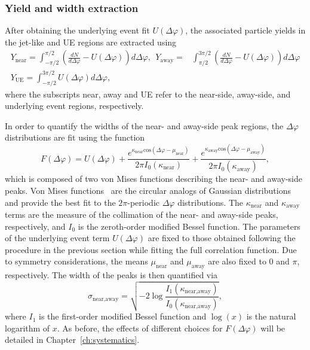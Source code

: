 \subsubsection{Yield and width extraction}
\label{sec:yield_extraction}
 After obtaining the underlying event fit $U(\Delta\varphi)$, the associated particle yields in the jet-like and UE regions are extracted using
\begin{eqnarray}
    Y_{\text{near}} = \int_{-\pi/2}^{\pi/2} (\frac{dN}{d\Delta\varphi}- U(\Delta\varphi))d\Delta\varphi,  \  \ Y_{\text{away}} = & \int_{\pi/2}^{3\pi/2} (\frac{dN}{d\Delta\varphi}- U(\Delta\varphi))d\Delta\varphi 
    \label{eq:jet_yields}
    \\ 
    Y_{\text{UE}} = \int_{-\pi/2}^{3\pi/2} U(\Delta\varphi)d\Delta\varphi,
\label{eq:ue_yield}
\end{eqnarray}
%
where the subscripts near, away and UE refer to the near-side, away-side, and underlying event regions, respectively.

In order to quantify the widths of the near- and away-side peak regions, the $\Delta\varphi$ distributions are fit using the function
%
\begin{equation}
    F(\Delta\varphi) = U(\Delta\varphi) + \frac{e^{\kappa_{\text{near}}\text{cos}(\Delta\varphi - \mu_{\text{near}})}}{2\pi I_0(\kappa_{\text{near}})} + \frac{e^{\kappa_{\text{away}}\text{cos}(\Delta\varphi - \mu_{\text{away}})}}{2\pi I_0(\kappa_{\text{away}})},
\label{eq:fullfit}
\end{equation}
%
which is composed of two von Mises functions describing the near- and away-side peaks. Von Mises functions~\cite{VonMises1, HFWidthPaper} are the circular analogs of Gaussian distributions and provide the best fit to the $2\pi$-periodic $\Delta\varphi$ distributions. The $\kappa_{\text{near}}$ and $\kappa_{\text{away}}$ terms are the measure of the collimation of the near- and away-side peaks, respectively, and $I_{0}$ is the zeroth-order modified Bessel function. The parameters of the underlying event term $U(\Delta\varphi)$ are fixed to those obtained following the procedure in the previous section while fitting the full correlation function. Due to symmetry considerations, the means $\mu_{\text{near}}$ and  $\mu_{\text{away}}$ are also fixed to $0$ and  $\pi$, respectively. The width of the peaks is then quantified via~\cite{VonMises1}
%
\begin{equation}
    \sigma_{\text{near,away}} = \sqrt{-2\log\frac{I_1(\kappa_{\text{near,away}})}{I_0(\kappa_{\text{near,away}})}},
\label{eq:width}
\end{equation}
%
where $I_1$ is the first-order modified Bessel function and $\log(x)$ is the natural logarithm of $x$. As before, the effects of different choices for $F(\Delta\varphi)$ will be detailed in Chapter~\ref{ch:systematics}.